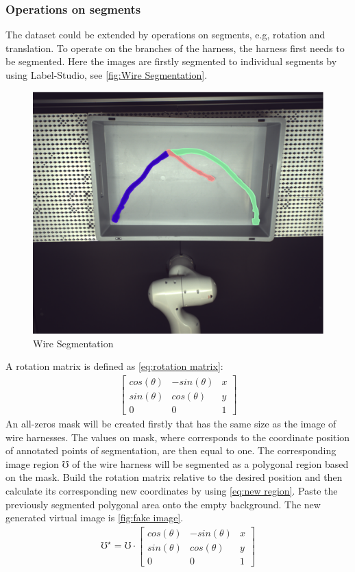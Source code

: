 \subsubsection{Operations on segments}
    The dataset could be extended by operations on segments, e.g, rotation and translation. To operate on the branches of the harness, the harness 
    first needs to be segmented. Here the images are firstly segmented to individual segments by using Label-Studio, see \autoref{fig:Wire Segmentation}.\\
	\begin{figure}[!htbp]
		\centering
		\includegraphics[width=0.6\linewidth]{example_images/img_0_segment}
		\caption{Wire Segmentation}
		\label{fig:Wire Segmentation}
	\end{figure}
	A rotation matrix is defined as \autoref{eq:rotation matrix}:
	\begin{align}
		\begin{bmatrix}
			cos(\theta)&  -sin(\theta )&x \\
			sin(\theta )&  cos(\theta )&y  \\
			0&  0&1
		\end{bmatrix} \label{eq:rotation matrix}
	\end{align}
	An all-zeros mask will be created firstly that has the same size as the image of wire harnesses. The values on mask, where corresponds to the coordinate position of
	annotated points of segmentation, are then equal to one. The corresponding image region $\mho$ of the wire harness will be segmented as a polygonal region based on the mask.
	Build the rotation matrix relative to the desired position and then calculate its corresponding new coordinates by using \autoref{eq:new region}. 
	Paste the previously segmented polygonal area onto the empty background. The new generated virtual image is \autoref{fig:fake image}.
	\begin{align}
		\mho ^{\star } = \mho \cdot \begin{bmatrix}
			cos(\theta)&  -sin(\theta )&x \\
			sin(\theta )&  cos(\theta )&y  \\
			0&  0&1
		\end{bmatrix} \label{eq:new region}
	\end{align}

